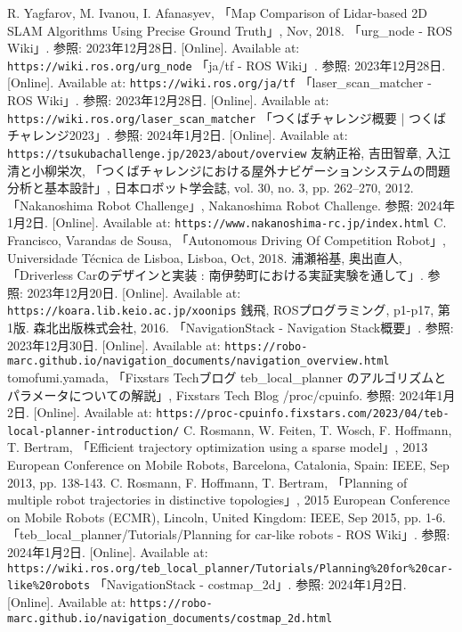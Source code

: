 \documentclass[a4paper,12pt]{jreport}
\begin{document}
\begin{thebibliography}{99}
  R. Yagfarov, M. Ivanou, I. Afanasyev, 「Map Comparison of Lidar-based 2D SLAM Algorithms Using Precise Ground Truth」, Nov, 2018.
  「urg\_node - ROS Wiki」. 参照: 2023年12月28日. [Online]. Available at: \verb|https://wiki.ros.org/urg_node|
  「ja/tf - ROS Wiki」. 参照: 2023年12月28日. [Online]. Available at: \verb|https://wiki.ros.org/ja/tf|
  「laser\_scan\_matcher - ROS Wiki」. 参照: 2023年12月28日. [Online]. Available at: \verb|https://wiki.ros.org/laser_scan_matcher|
  「つくばチャレンジ概要 | つくばチャレンジ2023」. 参照: 2024年1月2日. [Online]. Available at: \verb|https://tsukubachallenge.jp/2023/about/overview|
  友納正裕, 吉田智章, 入江清と小柳栄次, 「つくばチャレンジにおける屋外ナビゲーションシステムの問題分析と基本設計」, 日本ロボット学会誌, vol. 30, no. 3, pp. 262–270, 2012.
  「Nakanoshima Robot Challenge」, Nakanoshima Robot Challenge. 参照: 2024年1月2日. [Online]. Available at: \verb|https://www.nakanoshima-rc.jp/index.html|
  C. Francisco, Varandas de Sousa, 「Autonomous Driving Of Competition Robot」, Universidade Técnica de Lisboa, Lisboa, Oct, 2018.
  浦瀬裕基, 奥出直人, 「Driverless Carのデザインと実装 : 南伊勢町における実証実験を通して」. 参照: 2023年12月20日. [Online]. Available at: \verb|https://koara.lib.keio.ac.jp/xoonips|
  銭飛, ROSプログラミング, p1-p17, 第1版. 森北出版株式会社, 2016.
  「NavigationStack - Navigation Stack概要」. 参照: 2023年12月30日. [Online]. Available at: \verb|https://robo-marc.github.io/navigation_documents/navigation_overview.html|
  tomofumi.yamada, 「Fixstars Techブログ teb\_local\_planner のアルゴリズムとパラメータについての解説」, Fixstars Tech Blog /proc/cpuinfo. 参照: 2024年1月2日. [Online]. Available at: \verb|https://proc-cpuinfo.fixstars.com/2023/04/teb-local-planner-introduction/|
  C. Rosmann, W. Feiten, T. Wosch, F. Hoffmann, T. Bertram, 「Efficient trajectory optimization using a sparse model」, 2013 European Conference on Mobile Robots, Barcelona, Catalonia, Spain: IEEE, Sep 2013, pp. 138-143.
  C. Rosmann, F. Hoffmann, T. Bertram, 「Planning of multiple robot trajectories in distinctive topologies」, 2015 European Conference on Mobile Robots (ECMR), Lincoln, United Kingdom: IEEE, Sep 2015, pp. 1-6.
  「teb\_local\_planner/Tutorials/Planning for car-like robots - ROS Wiki」. 参照: 2024年1月2日. [Online]. Available at: \verb|https://wiki.ros.org/teb_local_planner/Tutorials/Planning%20for%20car-like%20robots|
  「NavigationStack - costmap\_2d」. 参照: 2024年1月2日. [Online]. Available at: \verb|https://robo-marc.github.io/navigation_documents/costmap_2d.html|
\end{thebibliography}
  
\end{document}
